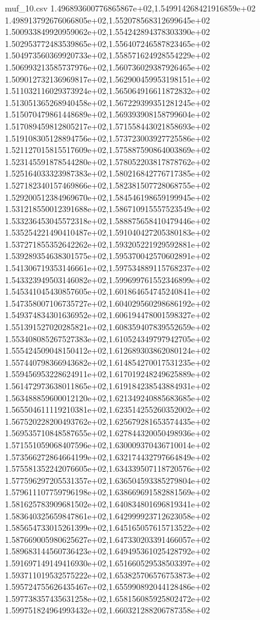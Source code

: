 \begin{filecontents*}{muf_10.csv}
1.496893600776865867e+02,1.549914268421916859e+02
1.498913792676066805e+02,1.552078568312699645e+02
1.500933849920959062e+02,1.554242894378303390e+02
1.502953772483539865e+02,1.556407246587823465e+02
1.504973560369920733e+02,1.558571624928554229e+02
1.506993213585737976e+02,1.560736029387926465e+02
1.509012732136969817e+02,1.562900459953198151e+02
1.511032116029373924e+02,1.565064916611872832e+02
1.513051365268940458e+02,1.567229399351281245e+02
1.515070479861448689e+02,1.569393908158799604e+02
1.517089459812805217e+02,1.571558443021858693e+02
1.519108305128894756e+02,1.573723003927725586e+02
1.521127015815517609e+02,1.575887590864003869e+02
1.523145591878544280e+02,1.578052203817878762e+02
1.525164033323987383e+02,1.580216842776717385e+02
1.527182340157469866e+02,1.582381507728068755e+02
1.529200512384969670e+02,1.584546198659199945e+02
1.531218550012391688e+02,1.586710915557523549e+02
1.533236453045572318e+02,1.588875658410479446e+02
1.535254221490410487e+02,1.591040427205380183e+02
1.537271855352642262e+02,1.593205221929592881e+02
1.539289354638301575e+02,1.595370042570602891e+02
1.541306719353146661e+02,1.597534889115768237e+02
1.543323949503146082e+02,1.599699761552346899e+02
1.545341045430857605e+02,1.601864654745240841e+02
1.547358007106735727e+02,1.604029560298686192e+02
1.549374834301636952e+02,1.606194478001598327e+02
1.551391527020285821e+02,1.608359407839552659e+02
1.553408085267527383e+02,1.610524349797942705e+02
1.555424509048150412e+02,1.612689303862080124e+02
1.557440798366943682e+02,1.614854270017531235e+02
1.559456953228624911e+02,1.617019248249625889e+02
1.561472973638011865e+02,1.619184238543884931e+02
1.563488859600012120e+02,1.621349240885683685e+02
1.565504611119210381e+02,1.623514255260352002e+02
1.567520228200493762e+02,1.625679281653574435e+02
1.569535710848587655e+02,1.627844320050498936e+02
1.571551059068407596e+02,1.630009370436710014e+02
1.573566272864664199e+02,1.632174432797664849e+02
1.575581352242076605e+02,1.634339507118720576e+02
1.577596297205531357e+02,1.636504593385279804e+02
1.579611107759796198e+02,1.638669691582881569e+02
1.581625783909681502e+02,1.640834801696819341e+02
1.583640325659847861e+02,1.642999923712623058e+02
1.585654733015261399e+02,1.645165057615713522e+02
1.587669005980625627e+02,1.647330203391466057e+02
1.589683144560736423e+02,1.649495361025428792e+02
1.591697149149416930e+02,1.651660529538503397e+02
1.593711019532575222e+02,1.653825706576753873e+02
1.595724755626435467e+02,1.655990892044128486e+02
1.597738357435631258e+02,1.658156085925802472e+02
1.599751824964993432e+02,1.660321288206787358e+02

\end{filecontents*}
